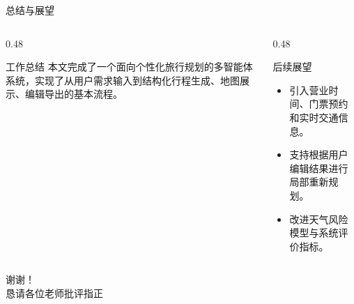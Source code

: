 \documentclass[aspectratio=169]{beamer}
\begin{document}
\begin{frame}{总结与展望}
  \begin{columns}[T]
    \begin{column}{0.48\linewidth}
      \begin{block}{工作总结}
        本文完成了一个面向个性化旅行规划的多智能体系统，实现了从用户需求输入到结构化行程生成、地图展示、编辑导出的基本流程。
      \end{block}
    \end{column}
    \begin{column}{0.48\linewidth}
      \begin{block}{后续展望}
        \begin{itemize}
          \item 引入营业时间、门票预约和实时交通信息。
          \item 支持根据用户编辑结果进行局部重新规划。
          \item 改进天气风险模型与系统评价指标。
        \end{itemize}
      \end{block}
    \end{column}
  \end{columns}
\end{frame}

\begin{frame}
  \begin{center}
    {\Huge 谢谢！}\\[1.5em]
    {\large 恳请各位老师批评指正}
  \end{center}
\end{frame}
\end{document}
